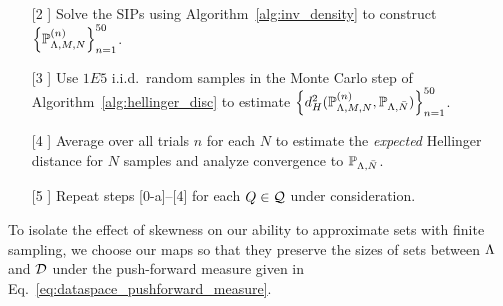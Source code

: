 \begin{itemize}
\item[[2]] Solve the SIPs using Algorithm~\ref{alg:inv_density} to construct $\left\{\mathbb{P}_{{\Lambda},M,N}^{(n)}\right\}_{n=1}^{50}$.
\item[[3]] Use $1E5$ i.i.d.~random samples in the Monte Carlo step of Algorithm~\ref{alg:hellinger_disc} to estimate $\left\{d_H^2( \mathbb{P}_{{\Lambda},M,N}^{(n)}, \mathbb{P}_{{\Lambda},\bar{N}})\right\}_{n=1}^{50}$.
\item[[4]] Average over all trials $n$ for each $N$ to estimate the {\em expected} Hellinger distance for $N$ samples and analyze convergence to $\mathbb{P}_{{\Lambda},\bar{N}}$. 
\item[[5]] Repeat steps [0-a]--[4] for each $Q\in\mathcal{Q}$ under consideration. 
\end{itemize}
To isolate the effect of skewness on our ability to approximate sets with finite sampling, we choose our maps so that they preserve the sizes of sets between ${\Lambda}$ and $\mathcal{D}$ under the push-forward measure given in Eq.~\eqref{eq:dataspace_pushforward_measure}. 

